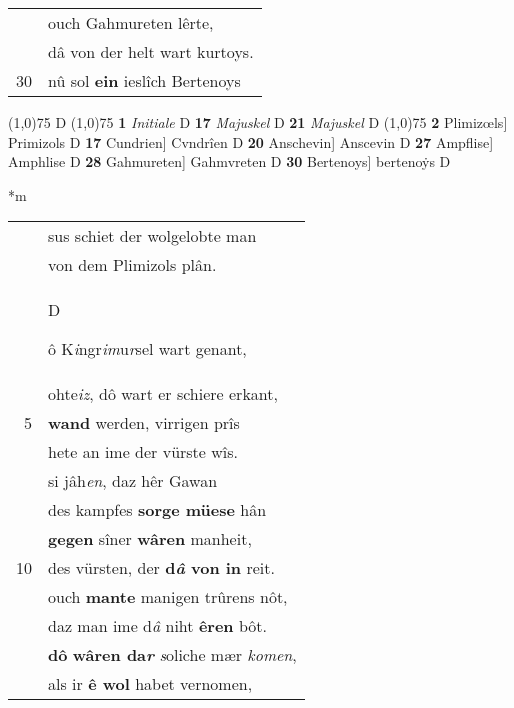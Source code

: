 \documentclass[8pt,a4paper,notitlepage]{article}
\begin{document}
\begin{table}[ht]
\begin{minipage}[t]{0.5\linewidth}
\begin{tabular}{rl}
 & ouch Gahmureten lêrte,\\ 
 & dâ von der helt wart kurtoys.\\ 
30 & nû sol \textbf{ein} ieslîch Bertenoys\\ 
\end{tabular}
\scriptsize
\line(1,0){75} \newline
D \newline
\line(1,0){75} \newline
\textbf{1} \textit{Initiale} D  \textbf{17} \textit{Majuskel} D  \textbf{21} \textit{Majuskel} D  \newline
\line(1,0){75} \newline
\textbf{2} Plimizœls] Primizols D \textbf{17} Cundrien] Cvndrîen D \textbf{20} Anschevin] Anscevin D \textbf{27} Ampflise] Amphlise D \textbf{28} Gahmureten] Gahmvreten D \textbf{30} Bertenoys] bertenoẏs D \newline
\end{minipage}
\hspace{0.5cm}
\begin{minipage}[t]{0.5\linewidth}
\small
\begin{center}*m
\end{center}
\begin{tabular}{rl}
 & sus schiet der wolgelobte man\\ 
 & von dem Plimizols plân.\\ 
 & \begin{large}D\end{large}ô K\textit{i}ngr\textit{im}u\textit{r}sel wart genant,\\ 
 & ohte\textit{iz}, dô wart er schiere erkant,\\ 
5 & \textbf{wand} werden, virrigen prîs\\ 
 & hete an ime der vürste wîs.\\ 
 & si jâh\textit{en}, daz hêr Gawan\\ 
 & des kampfes \textbf{sorge müese} hân\\ 
 & \textbf{gegen} sîner \textbf{wâren} manheit,\\ 
10 & des vürsten, der \textbf{d\textit{â} von in} reit.\\ 
 & ouch \textbf{mante} manigen trûrens nôt,\\ 
 & daz man ime d\textit{â} niht \textbf{êren} bôt.\\ 
 & \textbf{dô} \textbf{wâren da\textit{r}} \textit{s}oliche mær \textit{komen},\\ 
 & als ir \textbf{ê wol} habet vernomen,\\ 

\end{tabular}
\end{minipage}
\end{table}
\end{document}
